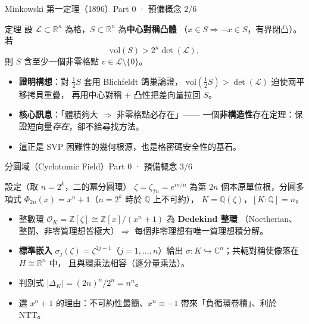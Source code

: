 \documentclass[aspectratio=169, 11pt]{beamer}
\newcommand{\R}{\mathbb{R}}
\newcommand{\Z}{\mathbb{Z}}
\newcommand{\Q}{\mathbb{Q}}
\newcommand{\OK}{\mathcal{O}_K}
\newcommand{\vol}{\mathrm{vol}}
\begin{document}
\begin{frame}{Minkowski 第一定理（1896）}{Part 0 · 預備概念 2/6}
  \begin{block}{定理}
    設 $\mathcal{L}\subset\R^n$ 為格，$S\subset\R^n$ 為\textbf{中心對稱凸體}
    （$x\in S\Rightarrow -x\in S$，有界閉凸）。若
    \[
      \vol(S) > 2^n \det(\mathcal{L}),
    \]
    則 $S$ 含至少一個非零格點 $v\in\mathcal{L}\setminus\{0\}$。
  \end{block}
  \begin{itemize}\small
    \item \textbf{證明構想}：對 $\tfrac12 S$ 套用 Blichfeldt 鴿巢論證，
      $\vol(\tfrac12 S)>\det(\mathcal{L})$ 迫使兩平移拷貝重疊，
      再用中心對稱 $+$ 凸性把差向量拉回 $S$。
    \item \textbf{核心訊息}：「體積夠大 $\Rightarrow$ 非零格點必存在」——
      一個\textbf{非構造性}存在定理：保證短向量\emph{存在}，卻不給尋找方法。
    \item 這正是 SVP 困難性的幾何根源，也是格密碼安全性的基石。
  \end{itemize}
\end{frame}

\begin{frame}{分圓域（Cyclotomic Field）}{Part 0 · 預備概念 3/6}
  \begin{block}{設定（取 $n=2^k$，二的冪分圓環）}
    $\zeta=\zeta_{2n}=e^{i\pi/n}$ 為第 $2n$ 個本原單位根，分圓多項式
    $\Phi_{2n}(x)=x^n+1$（$n=2^k$ 時於 $\Q$ 上不可約），
    $K=\Q(\zeta)$，$[K:\Q]=n$。
  \end{block}
  \begin{itemize}\small
    \item 整數環 $\OK=\Z[\zeta]\cong\Z[x]/(x^n+1)$ 為 \textbf{Dedekind 整環}
      （Noetherian、整閉、非零質理想皆極大）$\Rightarrow$ 每個非零理想有唯一質理想積分解。
    \item \textbf{標準嵌入} $\sigma_j(\zeta)=\zeta^{2j-1}$（$j=1,\dots,n$）給出
      $\sigma:K\hookrightarrow\mathbb{C}^n$；共軛對稱使像落在 $H\cong\R^n$ 中，
      且與環乘法相容（逐分量乘法）。
    \item 判別式 $|\Delta_K|=(2n)^n/2^n=n^n$。
    \item 選 $x^n+1$ 的理由：不可約性最簡、$x^n\equiv-1$ 帶來「負循環卷積」、利於 NTT。
  \end{itemize}
\end{frame}
\end{document}
